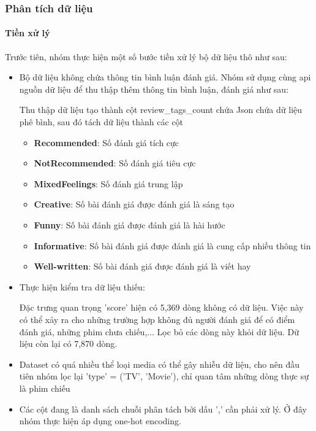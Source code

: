 \subsubsection{Phân tích dữ liệu}
    \paragraph{Tiền xử lý}
    \leavevmode

    Trước tiên, nhóm thực hiện một số bước tiền xử lý bộ dữ liệu thô như sau:

    \begin{itemize}
        \item  Bộ dữ liệu không chứa thông tin bình luận đánh giá. Nhóm sử dụng cùng api nguồn dữ liệu để thu thập thêm thông tin bình luận, đánh giá như sau:

        Thu thập dữ liệu tạo thành cột review\_tags\_count chứa Json chứa dữ liệu phê  bình, sau đó tách dữ liệu thành các cột

        \begin{itemize}
            \item \textbf{Recommended}: Số đánh giá tích cực
            \item \textbf{NotRecommended}: Số đánh giá tiêu cực
            
            \item \textbf{MixedFeelings}: Số đánh giá trung lập
            
            \item \textbf{Creative}: Số bài đánh giá được đánh giá là sáng tạo
            
            \item \textbf{Funny}: Số bài đánh giá được đánh giá là hài hước
            
            \item \textbf{Informative}: Số bài đánh giá được đánh giá là cung cấp nhiều thông tin
            
            \item \textbf{Well-written}: Số bài đánh giá được đánh giá là viết hay
        \end{itemize}
    
        \item Thực hiện kiểm tra dữ liệu thiếu:

        Đặc trưng quan trọng 'score' hiện có 5,369 dòng không có dữ liệu. Việc này có thể xảy ra cho những trường hợp không đủ người đánh giá để có điểm đánh giá, những phim chưa chiếu,... Lọc bỏ các dòng này khỏi dữ liệu. Dữ liệu còn lại có 7,870 dòng.
        
        \item Dataset có quá nhiều thể loại media có thể gây nhiễu dữ liệu, cho nên đầu tiên nhóm lọc lại 'type' = ('TV', 'Movie'), chỉ quan tâm những dòng thực sự là phim chiếu

        

        \item Các cột đang là danh sách chuỗi phân tách bởi dấu ',' cần phải xử lý. Ở đây nhóm thực hiện áp dụng one-hot encoding.
        
    \end{itemize}

